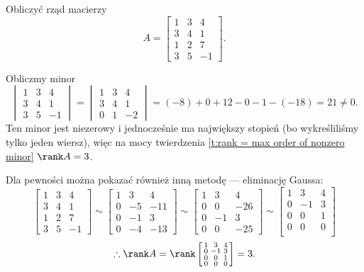 \begin{example}
    Obliczyć rząd macierzy
    \[ A = \begin{bmatrix}
        1 & 3 & 4 \\
        3 & 4 & 1 \\
        1 & 2 & 7 \\
        3 & 5 & -1
    \end{bmatrix}. \]
\end{example}
\begin{solution}
    Obliczmy minor
    \[ \begin{vmatrix}
        1 & 3 & 4 \\
        3 & 4 & 1 \\
        3 & 5 & -1
    \end{vmatrix} = \begin{vmatrix}
        1 & 3 & 4 \\
        3 & 4 & 1 \\
        0 & 1 & -2
    \end{vmatrix} = (-8) + 0 + 12 - 0 - 1 - (-18) = 21 \neq 0. \]
    Ten minor jest niezerowy i jednocześnie ma największy stopień (bo wykreśliliśmy tylko jeden wiersz), więc na mocy twierdzenia \ref{t:rank = max order of nonzero minor} $\rank A = 3$.

    Dla pewności można pokazać również inną metodę --- eliminację Gaussa:
    \[ \begin{bmatrix}
        1 & 3 & 4 \\
        3 & 4 & 1 \\
        1 & 2 & 7 \\
        3 & 5 & -1
    \end{bmatrix} \sim \begin{bmatrix}
        1 & 3 & 4 \\
        0 & -5 & -11 \\
        0 & -1 & 3 \\
        0 & -4 & -13
    \end{bmatrix} \sim \begin{bmatrix}
        1 & 3 & 4 \\
        0 & 0 & -26 \\
        0 & -1 & 3 \\
        0 & 0 & -25
    \end{bmatrix} \sim \begin{bmatrix}
        1 & 3 & 4 \\
        0 & -1 & 3 \\
        0 & 0 & 1 \\
        0 & 0 & 0 \\
    \end{bmatrix} \]
    \[ \therefore \rank A = \rank \left[\begin{smallmatrix}
        1 & 3 & 4 \\
        0 & -1 & 3 \\
        0 & 0 & 1 \\
        0 & 0 & 0 \\
    \end{smallmatrix}\right] = 3. \]
\end{solution}
